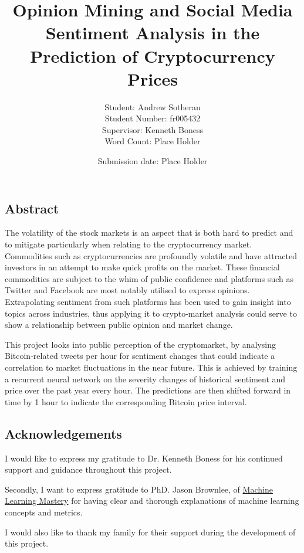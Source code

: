 \documentclass[oneside, 10pt]{article}
\title{Opinion Mining and Social Media Sentiment Analysis in the Prediction of Cryptocurrency Prices}
\date{Submission date: Place Holder}
\author{Student: Andrew Sotheran
	\\Student Number: fr005432
	\\Supervisor: Kenneth Boness
	\\Word Count: Place Holder}
\begin{document}
	
	\maketitle
	
	\vspace*{\fill}
	\begin{center}
		\section{Abstract}\label{abstract}
	\end{center}
		The volatility of the stock markets is an aspect that is both hard to predict and to mitigate particularly when relating to the cryptocurrency market. Commodities such as cryptocurrencies are profoundly volatile and have attracted investors in an attempt to make quick profits on the market. These financial commodities are subject to the whim of public confidence and platforms such as Twitter and Facebook are most notably utilised to express opinions. Extrapolating sentiment from such platforms has been used to gain insight into topics across industries, thus applying it to crypto-market analysis could serve to show a relationship between public opinion and market change. 
		
		This project looks into public perception of the cryptomarket, by analysing Bitcoin-related tweets per hour for sentiment changes that could indicate a correlation to market fluctuations in the near future. This is achieved by training a recurrent neural network on the severity changes of historical sentiment and price over the past year every hour. The predictions are then shifted forward in time by 1 hour to indicate the corresponding Bitcoin price interval.

	
	\newpage
	\begin{center}
		\section{Acknowledgements}\label{acknowledgements}
		I would like to express my gratitude to Dr. Kenneth Boness for his continued support and guidance throughout this project.  
		
		Secondly, I want to express gratitude to PhD. Jason Brownlee, of \href{machinelearningmastery.com}{Machine Learning Mastery} for having clear and thorough explanations of machine learning concepts and metrics.
		
		I would also like to thank my family for their support during the development of this project.
		
	\end{center}
	
\end{document}
